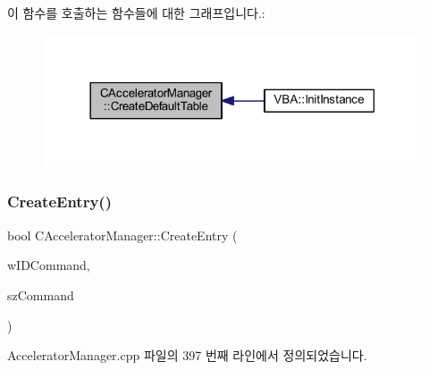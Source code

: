 이 함수를 호출하는 함수들에 대한 그래프입니다.\+:
\nopagebreak
\begin{figure}[H]
\begin{center}
\leavevmode
\includegraphics[width=318pt]{class_c_accelerator_manager_aaefac809b336df14e1a1a7d60f72ae28_icgraph}
\end{center}
\end{figure}
\mbox{\label{class_c_accelerator_manager_ab534c2d8c0d7d7e30c5e907677bfad68}} 
\subsubsection{\texorpdfstring{Create\+Entry()}{CreateEntry()}}
{\footnotesize\ttfamily bool C\+Accelerator\+Manager\+::\+Create\+Entry (\begin{DoxyParamCaption}\item[{W\+O\+RD}]{w\+I\+D\+Command,  }\item[{L\+P\+C\+T\+S\+TR}]{sz\+Command }\end{DoxyParamCaption})}



Accelerator\+Manager.\+cpp 파일의 397 번째 라인에서 정의되었습니다.


